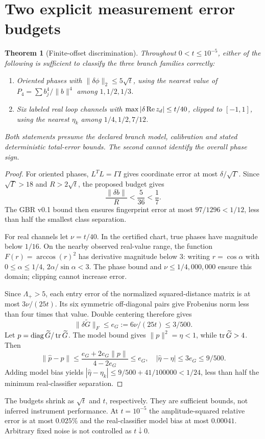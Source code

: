 \documentclass[11pt,a4paper]{article}
\newtheorem{theorem}{Theorem}\newtheorem{lemma}[theorem]{Lemma}
\begin{document}
\section{Two explicit measurement error budgets}
\begin{theorem}[Finite-offset discrimination]
Throughout $0<t\le10^{-5}$, either of the following is sufficient to classify the three branch families correctly:
\begin{enumerate}
\item Oriented phases with $\|\delta\phi\|_2\le5\sqrt t$, using the nearest value of $P_4=\sum b_j^4/\|b\|^4$ among $1,1/2,1/3$.
\item Six labeled real loop channels with $\max|\delta\operatorname{Re} z_d|\le t/40$, clipped to $[-1,1]$, using the nearest $\eta_k$ among $1/4,1/2,7/12$.
\end{enumerate}
Both statements presume the declared branch model, calibration and stated deterministic total-error bounds. The second cannot identify the overall phase sign.
\end{theorem}
\begin{proof}
For oriented phases, $L^TL=\Gamma I$ gives coordinate error at most $\delta/\sqrt\Gamma$. Since $\sqrt\Gamma>18$ and $R>2\sqrt t$, the proposed budget gives
\[
\frac{\|\delta b\|}{R}<\frac5{36}<\frac17.
\]
The GBR v0.1 bound then ensures fingerprint error at most $97/1296<1/12$, less than half the smallest class separation.

For real channels let $\nu=t/40$. In the certified chart, true phases have magnitude below $1/16$. On the nearby observed real-value range, the function $F(r)=\arccos(r)^2$ has derivative magnitude below 3: writing $r=\cos\alpha$ with $0\le\alpha\le1/4$, $2\alpha/\sin\alpha<3$. The phase bound and $\nu\le1/4{,}000{,}000$ ensure this domain; clipping cannot increase error.

Since $\Lambda_+>5$, each entry error of the normalized squared-distance matrix is at most $3\nu/(25t)$. Its six symmetric off-diagonal pairs give Frobenius norm less than four times that value. Double centering therefore gives
\[
\|\delta\widetilde G\|_F\le e_G:=6\nu/(25t)\le3/500.
\]
Let $p=\operatorname{diag}\widetilde G/\operatorname{tr}\widetilde G$. The model bound gives $\|p\|^2=\eta<1$, while $\operatorname{tr}\widetilde G>4$. Then
\[
\|\widehat p-p\|\le\frac{e_G+2e_G\|p\|}{4-2e_G}\le e_G,
\quad |\widehat\eta-\eta|\le3e_G\le9/500.
\]
Adding model bias yields $|\widehat\eta-\eta_k|\le9/500+41/100000<1/24$, less than half the minimum real-classifier separation.
\end{proof}
The budgets shrink as $\sqrt t$ and $t$, respectively. They are sufficient bounds, not inferred instrument performance. At $t=10^{-5}$ the amplitude-squared relative error is at most $0.025\%$ and the real-classifier model bias at most $0.00041$. Arbitrary fixed noise is not controlled as $t\downarrow0$.
\newpage
\end{document}
